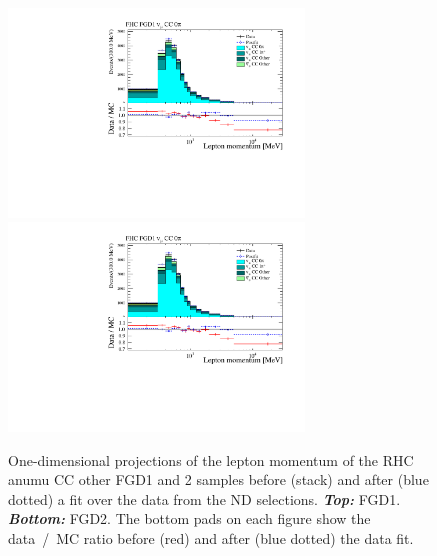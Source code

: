 \begin{figure}[ht]
  \center
  \includegraphics[keepaspectratio=true,width=0.7\textwidth,page=9]{images/BANFF/reactionCodeStacks_PrefitAndPostfit_mom.pdf}\\
  \includegraphics[keepaspectratio=true,width=0.7\textwidth,page=12]{images/BANFF/reactionCodeStacks_PrefitAndPostfit_mom.pdf}\\
  \begin{center}
    \caption[RHC $\bar{\nu}_\mu$ CC other FGD1 and 2 samples before
    and after a fit over the data from the ND280
    selections]{One-dimensional projections of the lepton momentum of
      the \Gls{RHC} \Gls{anumu} \Gls{CC} other \Gls{FGD}1 and 2
      samples before (stack) and after (blue dotted) a fit over the
      data from the \Gls{ND} selections. \textbf{\textit{Top:}}
      \Gls{FGD}1. \textbf{\textit{Bottom:}} \Gls{FGD}2. The bottom
      pads on each figure show the data~/~\Gls{MC} ratio before (red)
      and after (blue dotted) the data fit.}
    \label{fig:anumuCCOth}
  \end{center}
\end{figure}


